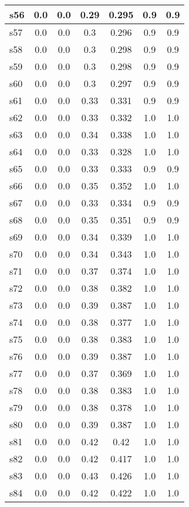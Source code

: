 \documentclass{article}
\begin{document}
\begin{tabular}{|l|c|c|c|c|c|c|}
\hline
s56 &0.0 & 0.0 & 0.29 & 0.295 & 0.9 & 0.9\\
\hline
s57 &0.0 & 0.0 & 0.3 & 0.296 & 0.9 & 0.9\\
\hline
s58 &0.0 & 0.0 & 0.3 & 0.298 & 0.9 & 0.9\\
\hline
s59 &0.0 & 0.0 & 0.3 & 0.298 & 0.9 & 0.9\\
\hline
s60 &0.0 & 0.0 & 0.3 & 0.297 & 0.9 & 0.9\\
\hline
s61 &0.0 & 0.0 & 0.33 & 0.331 & 0.9 & 0.9\\
\hline
s62 &0.0 & 0.0 & 0.33 & 0.332 & 1.0 & 1.0\\
\hline
s63 &0.0 & 0.0 & 0.34 & 0.338 & 1.0 & 1.0\\
\hline
s64 &0.0 & 0.0 & 0.33 & 0.328 & 1.0 & 1.0\\
\hline
s65 &0.0 & 0.0 & 0.33 & 0.333 & 0.9 & 0.9\\
\hline
s66 &0.0 & 0.0 & 0.35 & 0.352 & 1.0 & 1.0\\
\hline
s67 &0.0 & 0.0 & 0.33 & 0.334 & 0.9 & 0.9\\
\hline
s68 &0.0 & 0.0 & 0.35 & 0.351 & 0.9 & 0.9\\
\hline
s69 &0.0 & 0.0 & 0.34 & 0.339 & 1.0 & 1.0\\
\hline
s70 &0.0 & 0.0 & 0.34 & 0.343 & 1.0 & 1.0\\
\hline
s71 &0.0 & 0.0 & 0.37 & 0.374 & 1.0 & 1.0\\
\hline
s72 &0.0 & 0.0 & 0.38 & 0.382 & 1.0 & 1.0\\
\hline
s73 &0.0 & 0.0 & 0.39 & 0.387 & 1.0 & 1.0\\
\hline
s74 &0.0 & 0.0 & 0.38 & 0.377 & 1.0 & 1.0\\
\hline
s75 &0.0 & 0.0 & 0.38 & 0.383 & 1.0 & 1.0\\
\hline
s76 &0.0 & 0.0 & 0.39 & 0.387 & 1.0 & 1.0\\
\hline
s77 &0.0 & 0.0 & 0.37 & 0.369 & 1.0 & 1.0\\
\hline
s78 &0.0 & 0.0 & 0.38 & 0.383 & 1.0 & 1.0\\
\hline
s79 &0.0 & 0.0 & 0.38 & 0.378 & 1.0 & 1.0\\
\hline
s80 &0.0 & 0.0 & 0.39 & 0.387 & 1.0 & 1.0\\
\hline
s81 &0.0 & 0.0 & 0.42 & 0.42 & 1.0 & 1.0\\
\hline
s82 &0.0 & 0.0 & 0.42 & 0.417 & 1.0 & 1.0\\
\hline
s83 &0.0 & 0.0 & 0.43 & 0.426 & 1.0 & 1.0\\
\hline
s84 &0.0 & 0.0 & 0.42 & 0.422 & 1.0 & 1.0\\

\end{tabular}
\end{document}
